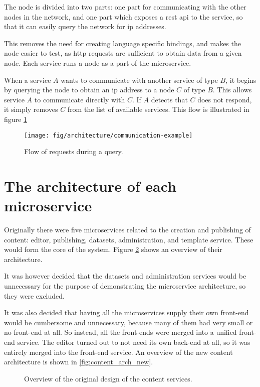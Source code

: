 The node is divided into two parts: one part for communicating with the other nodes in the network, and one part which exposes a \acrshort{rest} \acrshort{api} to the service, so that it can easily query the network for \acrshort{ip} addresses.

This removes the need for creating language specific bindings, and makes the node easier to test, as \acrshort{http} requests are sufficient to obtain data from a given node. Each service runs a node as a part of the microservice.

When a service $A$ wants to communicate with another service of type $B$, it begins by querying the node to obtain an \acrshort{ip} address to a node $C$ of type $B$. This allows service $A$ to communicate directly with $C$. If $A$ detects that $C$ does not respond, it simply removes $C$ from the list of available services. This flow is illustrated in figure \ref{fig:comm_example}
\begin{figure}[H]
    \centering
    \texttt{[image: fig/architecture/communication-example]}
    \caption{Flow of requests during a query.}\label{fig:comm_example}
\end{figure}

\section{The architecture of each microservice}\label{sec:microservices}

Originally there were five microservices related to the creation and publishing of content: editor, publishing, datasets, administration, and template service. These would form the core of the system. Figure \ref{fig:content_arch} shows an overview of their architecture.

It was however decided that the datasets and administration services would be unnecessary for the purpose of demonstrating the microservice architecture, so they were excluded.

It was also decided that having all the microservices supply their own front-end would be cumbersome and unnecessary, because many of them had very small or no front-end at all. So instead, all the front-ends were merged into a unified front-end service. The editor turned out to not need its own back-end at all, so it was entirely merged into the front-end service. An overview of the new content architecture is shown in \ref{fig:content_arch_new}.

\begin{figure}[H]
    \centering
    \scalebox{0.8}{}
    \caption{Overview of the original design of the content services.}\label{fig:content_arch}
\end{figure}

